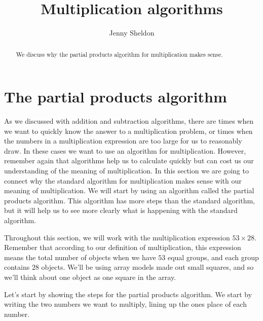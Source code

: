 \documentclass{ximera}
\title{Multiplication algorithms}
\author{Jenny Sheldon}
\begin{document}
\begin{abstract}
We discuss why the partial products algorithm for multiplication makes sense.
\end{abstract}
\maketitle



\section{The partial products algorithm}

As we discussed with addition and subtraction algorithms, there are times when we want to quickly know the answer to a multiplication problem, or times when the numbers in a multiplication expression are too large for us to reasonably draw. In these cases we want to use an algorithm for multiplication.  However, remember again that algorithms help us to calculate quickly but can cost us our understanding of the meaning of multiplication. In this section we are going to connect why the standard algorithm for multiplication makes sense with our meaning of multiplication. We will start by using an algorithm called the partial products algorithm. This algorithm has more steps than the standard algorithm, but it will help us to see more clearly what is happening with the standard algorithm.

Throughout this section, we will work with the multiplication expression $53 \times 28$. Remember that according to our definition of multiplication, this expression means the total number of objects when we have $53$ equal groups, and each group contains $28$ objects. We'll be using array models made out small squares, and so we'll think about one object as one square in the array.

Let's start by showing the steps for the partial products algorithm. We start by writing the two numbers we want to multiply, lining up the ones place of each number.

\begin{image}
\end{image}
\end{document}
